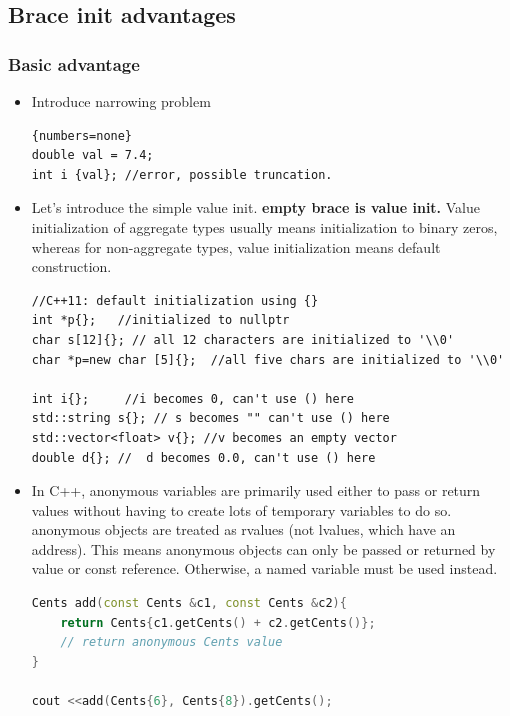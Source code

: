 \documentclass[a4paper,11pt,twoside]{book}
\begin{document}
\subsection{Brace init advantages}
			 

\subsubsection{Basic advantage}
\begin{itemize}
\item Introduce narrowing problem
\begin{lstlisting}{numbers=none}
double val = 7.4;
int i {val}; //error, possible truncation.
\end{lstlisting}


\item Let's introduce the simple value init. \textbf{empty brace is value init.} Value initialization of aggregate types usually means initialization to binary zeros, whereas for non-aggregate types, value initialization means default construction.
\begin{lstlisting}[numbers = none]
//C++11: default initialization using {}
int *p{};   //initialized to nullptr
char s[12]{}; // all 12 characters are initialized to '\\0'
char *p=new char [5]{};  //all five chars are initialized to '\\0'

int i{};     //i becomes 0, can't use () here         
std::string s{}; // s becomes "" can't use () here  
std::vector<float> v{}; //v becomes an empty vector
double d{}; //  d becomes 0.0, can't use () here        
\end{lstlisting}




\item In C++, anonymous variables are primarily used either to pass or return values without having to create lots of temporary variables to do so. anonymous objects are treated as rvalues (not lvalues, which have an address). This means anonymous objects can only be passed or returned by value or const reference. Otherwise, a named variable must be used instead.

\begin{lstlisting}[frame=single, language=c++]
Cents add(const Cents &c1, const Cents &c2){
	return Cents{c1.getCents() + c2.getCents()};
	// return anonymous Cents value
}

cout <<add(Cents{6}, Cents{8}).getCents();
\end{lstlisting}


\end{itemize}
\end{document}
